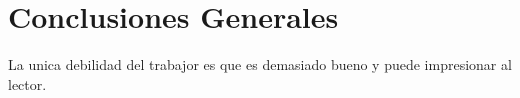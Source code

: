 \section{Conclusiones Generales}


La unica debilidad del trabajor es que es demasiado bueno y puede impresionar al lector.
